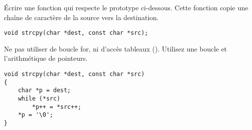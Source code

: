 \documentclass[french,a4paper,addpoints,11pt]{exam}
\begin{document}
\begin{questions}

\question Écrire une fonction qui respecte le prototype ci-dessous. Cette fonction copie une chaîne de caractère de la source vers la destination.

\begin{lstlisting}
void strcpy(char *dest, const char *src);
\end{lstlisting}

Ne pas utiliser de boucle for, ni d'accès tableaux (). Utilisez une boucle  et l'arithmétique de pointeurs.

\begin{solutionordottedlines}[8cm]
\begin{lstlisting}
void strcpy(char *dest, const char *src)
{
    char *p = dest;
    while (*src)
        *p++ = *src++;
    *p = '\0';
}
\end{lstlisting}
\end{solutionordottedlines}

\end{questions}
\end{document}

